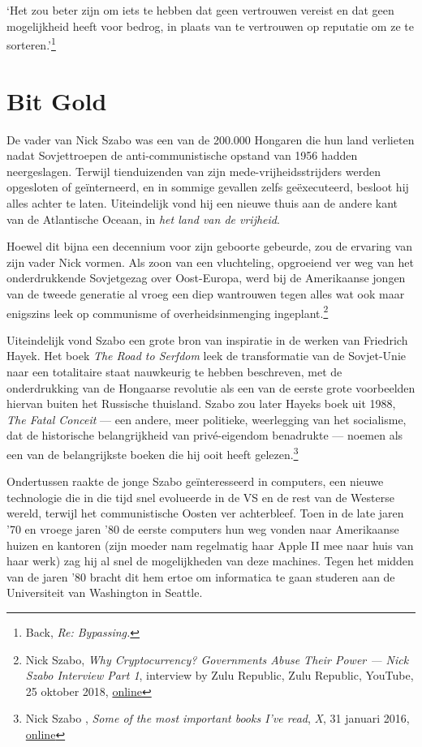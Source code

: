 \documentclass[
  a5paper,
  smalldemyvopaper,11pt,twoside,onecolumn,openright,extrafontsizes,
hidelinks]{memoir}
\renewenvironment{quote}%
               {\list{}{\rightmargin=.3cm\leftmargin=.3cm}%
                \itshape \item[]}%
               {\endlist}
\begin{document}
\begin{quote}
`Het zou beter zijn om iets te hebben dat geen vertrouwen vereist en dat
geen mogelijkheid heeft voor bedrog, in plaats van te vertrouwen op
reputatie om ze te sorteren.'\footnote{Back, \emph{Re: Bypassing.}}
\end{quote}

\chapter{Bit Gold}\label{bit-gold}

De vader van Nick Szabo was een van de 200.000 Hongaren die hun land
verlieten nadat Sovjettroepen de anti-communistische opstand van 1956
hadden neergeslagen. Terwijl tienduizenden van zijn
mede-vrijheidsstrijders werden opgesloten of geïnterneerd, en in sommige
gevallen zelfs geëxecuteerd, besloot hij alles achter te laten.
Uiteindelijk vond hij een nieuwe thuis aan de andere kant van de
Atlantische Oceaan, in \emph{het land van de vrijheid}.

Hoewel dit bijna een decennium voor zijn geboorte gebeurde, zou de
ervaring van zijn vader Nick vormen. Als zoon van een vluchteling,
opgroeiend ver weg van het onderdrukkende Sovjetgezag over Oost-Europa,
werd bij de Amerikaanse jongen van de tweede generatie al vroeg een diep
wantrouwen tegen alles wat ook maar enigszins leek op communisme of
overheidsinmenging ingeplant.\footnote{Nick Szabo, \emph{Why
  Cryptocurrency? Governments Abuse Their Power --- Nick Szabo Interview
  Part 1}, interview by Zulu Republic, Zulu Republic, YouTube, 25
  oktober 2018,
  \href{https://www.youtube.com/watch?v=LZw4LNLYUgc}{online}}

Uiteindelijk vond Szabo een grote bron van inspiratie in de werken van
Friedrich Hayek. Het boek \emph{The Road to Serfdom} leek de
transformatie van de Sovjet-Unie naar een totalitaire staat nauwkeurig
te hebben beschreven, met de onderdrukking van de Hongaarse revolutie
als een van de eerste grote voorbeelden hiervan buiten het Russische
thuisland. Szabo zou later Hayeks boek uit 1988, \emph{The Fatal
Conceit} --- een andere, meer politieke, weerlegging van het socialisme,
dat de historische belangrijkheid van privé-eigendom benadrukte ---
noemen als een van de belangrijkste boeken die hij ooit heeft
gelezen.\footnote{Nick Szabo , \emph{Some of the most important books
  I've read}, \emph{X}, 31 januari 2016,
  \href{https://x.com/NickSzabo4/status/693682157525401601}{online}}

Ondertussen raakte de jonge Szabo geïnteresseerd in computers, een
nieuwe technologie die in die tijd snel evolueerde in de VS en de rest
van de Westerse wereld, terwijl het communistische Oosten ver
achterbleef. Toen in de late jaren '70 en vroege jaren '80 de eerste
computers hun weg vonden naar Amerikaanse huizen en kantoren (zijn
moeder nam regelmatig haar Apple II mee naar huis van haar werk) zag hij
al snel de mogelijkheden van deze machines. Tegen het midden van de
jaren '80 bracht dit hem ertoe om informatica te gaan studeren aan de
Universiteit van Washington in Seattle.
\end{document}
